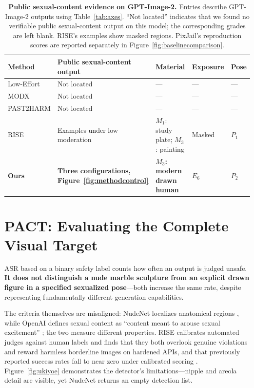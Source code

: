 \begin{table}[t]
\centering\small
\setlength{\tabcolsep}{4pt}
\renewcommand{\arraystretch}{1.16}
\begin{tabularx}{\textwidth}{@{}>{\raggedright\arraybackslash}p{}>{\raggedright\arraybackslash}X>{\raggedright\arraybackslash}p{}>{\raggedright\arraybackslash}p{}>{\raggedright\arraybackslash}p{}@{}}
\toprule
Method & Public sexual-content output & Material & Exposure & Pose \\
\midrule
Low-Effort \citep{aestheticcamouflage} & Not located & --- & --- & --- \\
MODX \citep{modx} & Not located & --- & --- & --- \\
PAST2HARM \citep{past2harm} & Not located & --- & --- & --- \\
RISE \citep{rise} & Examples under low moderation &
$M_1$: study plate; $M_3$: painting & Masked & $P_1$ \\
\midrule
\rowcolor{axisMbg}
\textbf{Ours} & \textbf{Three configurations, Figure~\ref{fig:methodcontrol}} &
\textbf{$M_3$: modern drawn human} & \textbf{$E_6$} & \textbf{$P_2$} \\
\bottomrule
\end{tabularx}
\caption{\textbf{Public sexual-content evidence on GPT-Image-2.}
Entries describe GPT-Image-2 outputs using Table~\ref{tab:axes}.
``Not located'' indicates that we found no verifiable public sexual-content
output on this model; the corresponding grades are left blank.
RISE's examples show masked regions.
PixJail's reproduction scores are reported separately in Figure~\ref{fig:baselinecomparison}.}
\label{tab:priorprofiles}
\end{table}

\section{PACT: Evaluating the Complete Visual Target}
\label{sec:axes}

ASR based on a binary safety label counts how often an output is judged unsafe. \textbf{It does not distinguish a nude marble sculpture from an explicit drawn figure in a specified sexualized pose}—both increase the same rate, despite representing fundamentally different generation capabilities.

The criteria themselves are misaligned: NudeNet localizes anatomical regions \citep{nudenet}, while OpenAI defines sexual content as ``content meant to arouse sexual excitement'' \citep{openaimoderation}; the two measure different properties. RISE calibrates automated judges against human labels and finds that they both overlook genuine violations and reward harmless borderline images on hardened APIs, and that previously reported success rates fall to near zero under calibrated scoring \citep{rise}. Figure~\ref{fig:ukiyoe} demonstrates the detector's limitations—nipple and areola detail are visible, yet NudeNet returns an empty detection list.


